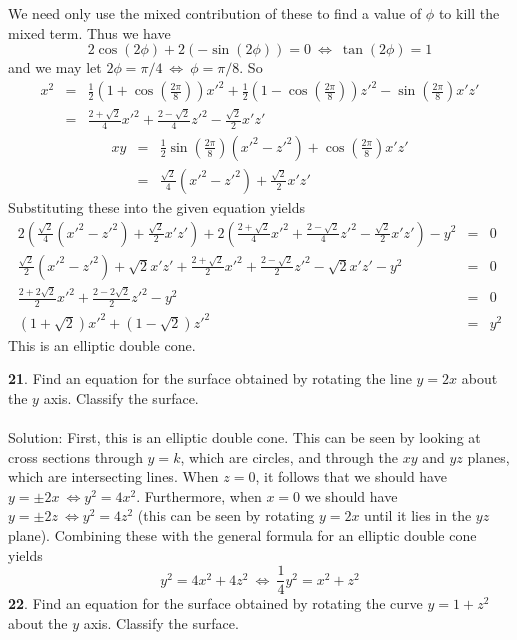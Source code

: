 \documentclass[12pt]{amsbook}
\begin{document}
\begin{enumerate}
$$$$
We need only use the mixed contribution of these to find a value of $\phi$ to kill the mixed term. Thus we have 
$$2\cos(2\phi)+2(-\sin(2\phi))=0 \ \Leftrightarrow \ \tan(2\phi)=1$$
and we may let $2\phi=\pi/4 \ \Leftrightarrow \ \phi=\pi/8$. So 
\begin{eqnarray*}
x^2&=&\frac{1}{2}(1+\cos(\frac{2\pi}{8}))x'^2+\frac{1}{2}(1-\cos(\frac{2\pi}{8}))z'^2-\sin(\frac{2\pi}{8})x'z'\\
&=&\frac{2+\sqrt{2}}{4}x'^2+\frac{2-\sqrt{2}}{4}z'^2-\frac{\sqrt{2}}{2}x'z'
\end{eqnarray*}
\begin{eqnarray*}
xy&=&\frac{1}{2}\sin(\frac{2\pi}{8})(x'^2-z'^2)+\cos(\frac{2\pi}{8})x'z'\\
&=&\frac{\sqrt{2}}{4}(x'^2-z'^2)+\frac{\sqrt{2}}{2}x'z'
\end{eqnarray*}
Substituting these into the given equation yields
\begin{eqnarray*}
2(\frac{\sqrt{2}}{4}(x'^2-z'^2)+\frac{\sqrt{2}}{2}x'z')+2(\frac{2+\sqrt{2}}{4}x'^2+\frac{2-\sqrt{2}}{4}z'^2-\frac{\sqrt{2}}{2}x'z')-y^2&=&0\\
\frac{\sqrt{2}}{2}(x'^2-z'^2)+\sqrt{2}x'z'+\frac{2+\sqrt{2}}{2}x'^2+\frac{2-\sqrt{2}}{2}z'^2-\sqrt{2}x'z'-y^2&=&0\\
\frac{2+2\sqrt{2}}{2}x'^2+\frac{2-2\sqrt{2}}{2}z'^2-y^2&=&0\\
(1+\sqrt{2})x'^2+(1-\sqrt{2})z'^2&=&y^2
\end{eqnarray*}
This is an elliptic double cone.
 \end{enumerate}  
{\small\bf 21}. Find an equation for the surface obtained by rotating
the line $y=2x$ about the $y$ axis. Classify the surface.\\
\\
{\sc Solution}: First, this is an elliptic double cone. This can be seen by looking at cross sections through $y=k$, which are circles, and through the $xy$ and $yz$ planes, which are intersecting lines. When $z=0$, it follows that we should have $y=\pm 2x \ \Leftrightarrow y^2=4x^2$. Furthermore, when $x=0$ we should have $y=\pm 2z \ \Leftrightarrow y^2=4z^2$ (this can be seen by rotating $y=2x$ until it lies in the $yz$ plane). Combining these with the general formula for an elliptic double cone yields
$$y^2=4x^2+4z^2 \ \Leftrightarrow \ \frac{1}{4}y^2=x^2+z^2$$
{\small\bf 22}.  Find an equation for the surface obtained by
rotating the curve $y=1+z^2$ about the $y$ axis. Classify 
the surface.\\
\\
\end{document}
